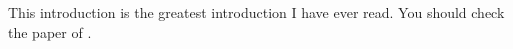 This introduction is the greatest introduction I have ever read. You should check the paper of \cite{Martin1984}.

\lipsum[1-3]